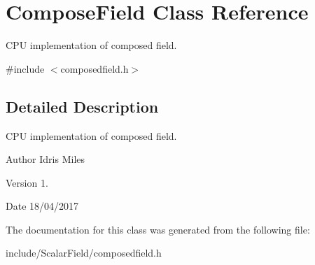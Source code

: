 \hypertarget{classComposeField}{}\section{Compose\+Field Class Reference}
\label{classComposeField}


C\+PU implementation of composed field.  




{\ttfamily \#include $<$composedfield.\+h$>$}



\subsection{Detailed Description}
C\+PU implementation of composed field. 

\begin{DoxyAuthor}{Author}
Idris Miles 
\end{DoxyAuthor}
\begin{DoxyVersion}{Version}
1. 
\end{DoxyVersion}
\begin{DoxyDate}{Date}
18/04/2017 
\end{DoxyDate}


The documentation for this class was generated from the following file\+:\begin{DoxyCompactItemize}
\item 
include/\+Scalar\+Field/composedfield.\+h\end{DoxyCompactItemize}
